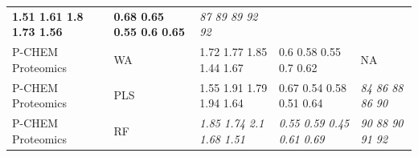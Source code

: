 \documentclass[utf8]{frontiersHLTH} %
\begin{document}
\begin{longtable}[]{@{}lllll@{}}
\begin{minipage}[t]{0.19\columnwidth}
\textbf{1.51 1.61 1.8 1.73 1.56}\strut
\end{minipage} & \begin{minipage}[t]{0.19\columnwidth}\raggedright\strut
\textbf{0.68 0.65 0.55 0.6 0.65}\strut
\end{minipage} & \begin{minipage}[t]{0.27\columnwidth}\raggedright\strut
\emph{87 89 89 92 92}\strut
\end{minipage}\tabularnewline
\begin{minipage}[t]{0.13\columnwidth}\raggedright\strut
P-CHEM Proteomics\strut
\end{minipage} & \begin{minipage}[t]{0.08\columnwidth}\raggedright\strut
WA\strut
\end{minipage} & \begin{minipage}[t]{0.19\columnwidth}\raggedright\strut
1.72 1.77 1.85 1.44 1.67\strut
\end{minipage} & \begin{minipage}[t]{0.19\columnwidth}\raggedright\strut
0.6 0.58 0.55 0.7 0.62\strut
\end{minipage} & \begin{minipage}[t]{0.27\columnwidth}\raggedright\strut
NA\strut
\end{minipage}\tabularnewline
\begin{minipage}[t]{0.13\columnwidth}\raggedright\strut
P-CHEM Proteomics\strut
\end{minipage} & \begin{minipage}[t]{0.08\columnwidth}\raggedright\strut
PLS\strut
\end{minipage} & \begin{minipage}[t]{0.19\columnwidth}\raggedright\strut
1.55 1.91 1.79 1.94 1.64\strut
\end{minipage} & \begin{minipage}[t]{0.19\columnwidth}\raggedright\strut
0.67 0.54 0.58 0.51 0.64\strut
\end{minipage} & \begin{minipage}[t]{0.27\columnwidth}\raggedright\strut
\emph{84 86 88 86 90}\strut
\end{minipage}\tabularnewline
\begin{minipage}[t]{0.13\columnwidth}\raggedright\strut
P-CHEM Proteomics\strut
\end{minipage} & \begin{minipage}[t]{0.08\columnwidth}\raggedright\strut
RF\strut
\end{minipage} & \begin{minipage}[t]{0.19\columnwidth}\raggedright\strut
\emph{1.85 1.74 2.1 1.68 1.51}\strut
\end{minipage} & \begin{minipage}[t]{0.19\columnwidth}\raggedright\strut
\emph{0.55 0.59 0.45 0.61 0.69}\strut
\end{minipage} & \begin{minipage}[t]{0.27\columnwidth}\raggedright\strut
\emph{90 88 90 91 92}\strut
\end{minipage}\tabularnewline
\bottomrule
\end{longtable}
\end{document}
